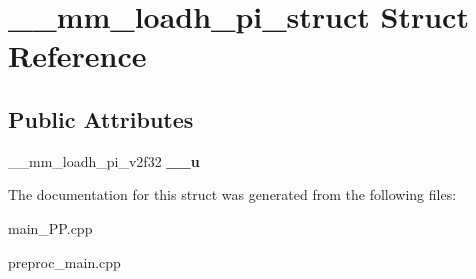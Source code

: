 \hypertarget{struct____mm__loadh__pi__struct}{\section{\+\_\+\+\_\+mm\+\_\+loadh\+\_\+pi\+\_\+struct Struct Reference}
\label{struct____mm__loadh__pi__struct}
}
\subsection*{Public Attributes}
\begin{DoxyCompactItemize}
\item 
\hypertarget{struct____mm__loadh__pi__struct_a1796cc35eb71d5746a9f3c6e9ccc60e4}{\+\_\+\+\_\+mm\+\_\+loadh\+\_\+pi\+\_\+v2f32 {\bfseries \+\_\+\+\_\+u}}\label{struct____mm__loadh__pi__struct_a1796cc35eb71d5746a9f3c6e9ccc60e4}

\end{DoxyCompactItemize}


The documentation for this struct was generated from the following files\+:\begin{DoxyCompactItemize}
\item 
main\+\_\+\+P\+P.\+cpp\item 
preproc\+\_\+main.\+cpp\end{DoxyCompactItemize}
